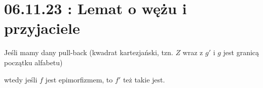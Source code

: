 \section{06.11.23 : Lemat o wężu i przyjaciele}

\begin{lemma}
  Jeśli mamy dany pull-back (kwadrat kartezjański, tzn. $Z$ wraz z $g'$ i $g$ jest granicą początku alfabetu)
  \begin{center}\end{center}
  wtedy jeśli $f$ jest epimorfizmem, to $f'$ też takie jest.
\end{lemma}

